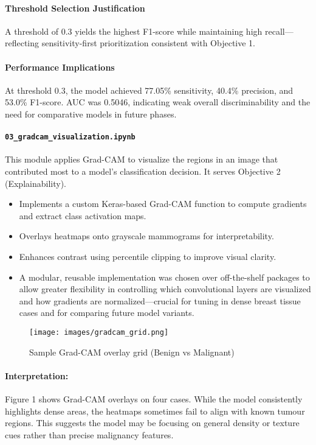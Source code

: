 \documentclass[12pt]{article}
\begin{document}
\paragraph{Threshold Selection Justification}
A threshold of 0.3 yields the highest F1-score while maintaining high recall—reflecting sensitivity-first prioritization consistent with Objective 1.

\paragraph{Performance Implications}
At threshold 0.3, the model achieved 77.05\% sensitivity, 40.4\% precision, and 53.0\% F1-score. AUC was 0.5046, indicating weak overall discriminability and the need for comparative models in future phases.

\paragraph{\texttt{03\_gradcam\_visualization.ipynb}}
This module applies Grad-CAM to visualize the regions in an image that contributed most to a model’s classification decision. It serves Objective 2 (Explainability).

\begin{itemize}
    \item Implements a custom Keras-based Grad-CAM function to compute gradients and extract class activation maps.
    \item Overlays heatmaps onto grayscale mammograms for interpretability.
    \item Enhances contrast using percentile clipping to improve visual clarity.
    \item A modular, reusable implementation was chosen over off-the-shelf packages to allow greater flexibility in controlling which convolutional layers are visualized and how gradients are normalized—crucial for tuning in dense breast tissue cases and for comparing future model variants.
\end{itemize}

\begin{figure}[H]
\centering
\texttt{[image: images/gradcam\_grid.png]}
\caption{Sample Grad-CAM overlay grid (Benign vs Malignant)}
\end{figure}

\paragraph{Interpretation:}
Figure 1 shows Grad-CAM overlays on four cases. While the model consistently highlights dense areas, the heatmaps sometimes fail to align with known tumour regions. This suggests the model may be focusing on general density or texture cues rather than precise malignancy features.
\end{document}
